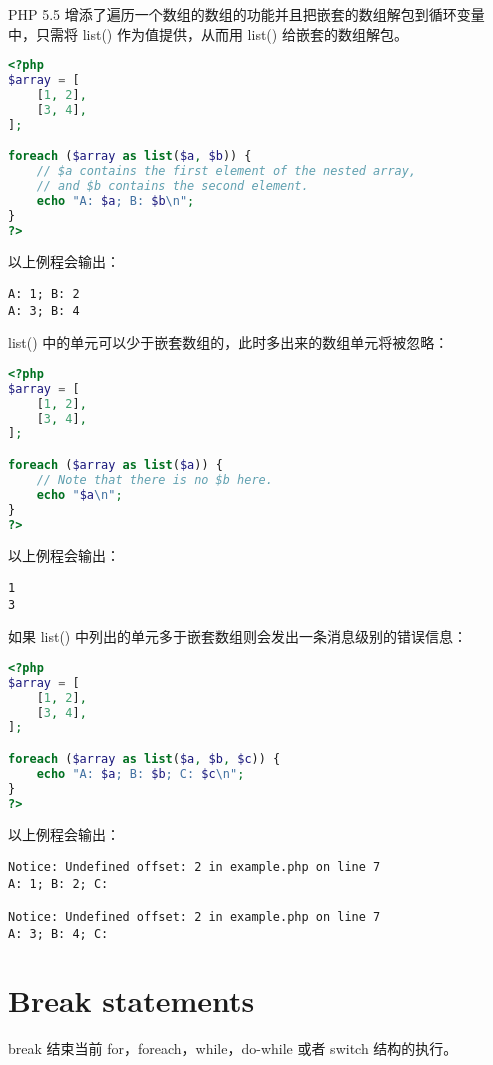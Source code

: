PHP 5.5 增添了遍历一个数组的数组的功能并且把嵌套的数组解包到循环变量中，只需将 list() 作为值提供，从而用 list() 给嵌套的数组解包。

\begin{lstlisting}[language=PHP]
<?php
$array = [
    [1, 2],
    [3, 4],
];

foreach ($array as list($a, $b)) {
    // $a contains the first element of the nested array,
    // and $b contains the second element.
    echo "A: $a; B: $b\n";
}
?>
\end{lstlisting}

以上例程会输出：

\begin{verbatim}
A: 1; B: 2
A: 3; B: 4
\end{verbatim}

list() 中的单元可以少于嵌套数组的，此时多出来的数组单元将被忽略：

\begin{lstlisting}[language=PHP]
<?php
$array = [
    [1, 2],
    [3, 4],
];

foreach ($array as list($a)) {
    // Note that there is no $b here.
    echo "$a\n";
}
?>
\end{lstlisting}

以上例程会输出：

\begin{verbatim}
1
3
\end{verbatim}

如果 list() 中列出的单元多于嵌套数组则会发出一条消息级别的错误信息：


\begin{lstlisting}[language=PHP]
<?php
$array = [
    [1, 2],
    [3, 4],
];

foreach ($array as list($a, $b, $c)) {
    echo "A: $a; B: $b; C: $c\n";
}
?>
\end{lstlisting}

以上例程会输出：


\begin{verbatim}
Notice: Undefined offset: 2 in example.php on line 7
A: 1; B: 2; C: 

Notice: Undefined offset: 2 in example.php on line 7
A: 3; B: 4; C: 
\end{verbatim}

\section{Break statements}

break 结束当前 for，foreach，while，do-while 或者 switch 结构的执行。

